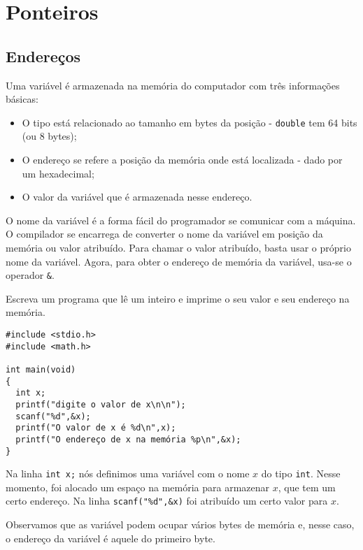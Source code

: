 

\chapter{Ponteiros}
\section{Endereços}
Uma variável é armazenada na memória do computador com três informações básicas: 
\begin{itemize}
 \item O tipo está relacionado ao tamanho em bytes da posição - \verb|double| tem 64 bits (ou 8 bytes);
 \item O endereço se refere a posição da memória onde está localizada - dado por um hexadecimal;
 \item O valor da variável que é armazenada nesse endereço.
\end{itemize}
O nome da variável é a forma fácil do programador se comunicar com a máquina. O compilador se encarrega de converter o nome da variável em posição da memória ou valor atribuído. Para chamar o valor atribuído, basta usar o próprio nome da variável. Agora, para obter o endereço de memória da variável, usa-se o operador \verb|&|.
\begin{ex}
Escreva um programa que lê um inteiro e imprime o seu valor e seu endereço na memória.
\end{ex}
\begin{verbatim}
#include <stdio.h>
#include <math.h>

int main(void)
{
  int x;
  printf("digite o valor de x\n\n");
  scanf("%d",&x);
  printf("O valor de x é %d\n",x);
  printf("O endereço de x na memória %p\n",&x);
}
\end{verbatim}
Na linha \verb|int x;| nós definimos uma variável com o nome $x$ do tipo \verb|int|. Nesse momento, foi alocado um espaço na memória para armazenar $x$, que tem um certo endereço. Na linha \verb|scanf("%d",&x)| foi atribuído um certo valor para $x$. 

Observamos que as variável podem ocupar vários bytes de memória e, nesse caso, o endereço da variável é aquele do primeiro byte.
